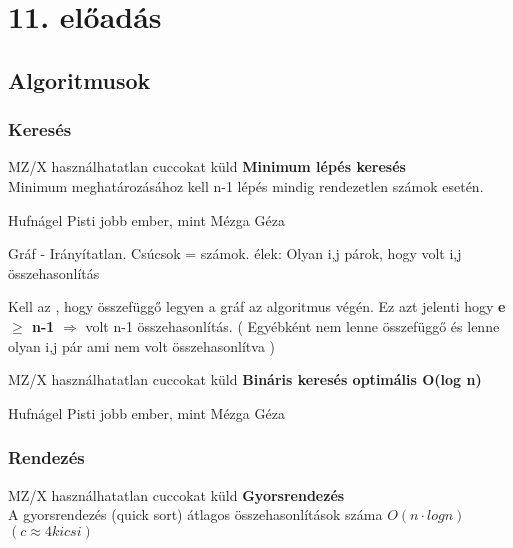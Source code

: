 \section{11. előadás}

\subsection{Algoritmusok}

\subsubsection{Keresés}

	\begin{tetel}{MZ/X használhatatlan cuccokat küld}
   \textbf{Minimum lépés keresés} \\[3pt]
	Minimum meghatározásához kell n-1 lépés mindig rendezetlen számok esetén.
\end{tetel}

\begin{bizonyitas}{Hufnágel Pisti jobb ember, mint Mézga Géza}

		Gráf - Irányítatlan. Csúcsok = számok. élek: Olyan i,j párok, hogy volt i,j összehasonlítás

		Kell az , hogy összefüggő legyen a gráf az algoritmus végén. Ez azt jelenti hogy \textbf{e $\geq$ n-1} $\Rightarrow$ volt n-1 összehasonlítás. ( Egyébként nem lenne összefüggő és lenne olyan i,j pár ami nem volt összehasonlítva )\\[0pt]
\end{bizonyitas}

	\begin{tetel}{MZ/X használhatatlan cuccokat küld}
   \textbf{Bináris keresés optimális O(log n)} \\[3pt]
   \end{tetel}

\begin{bizonyitas}{Hufnágel Pisti jobb ember, mint Mézga Géza}
 \\[0pt] %
\end{bizonyitas}

\subsubsection{Rendezés}

	\begin{tetel}{MZ/X használhatatlan cuccokat küld}
  \textbf{Gyorsrendezés} \\[3pt]
	 A gyorsrendezés (quick sort) átlagos összehasonlítások száma $O(n\cdot log n)$ $(c \approx4  kicsi)$\\[4pt]
   \end{tetel}

